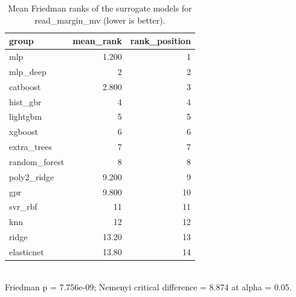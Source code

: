 \begin{table}[!t]
\centering
\caption{Mean Friedman ranks of the surrogate models for read_margin_mv (lower is better).}
\label{tab:statistics_surrogate_ranks_surrogate_read_margin_mv}
\footnotesize
\begin{tabular}{lrr}
\toprule
group & mean\_rank & rank\_position \\
\midrule
mlp & 1.200 & 1 \\
mlp\_deep & 2 & 2 \\
catboost & 2.800 & 3 \\
hist\_gbr & 4 & 4 \\
lightgbm & 5 & 5 \\
xgboost & 6 & 6 \\
extra\_trees & 7 & 7 \\
random\_forest & 8 & 8 \\
poly2\_ridge & 9.200 & 9 \\
gpr & 9.800 & 10 \\
svr\_rbf & 11 & 11 \\
knn & 12 & 12 \\
ridge & 13.20 & 13 \\
elasticnet & 13.80 & 14 \\
\bottomrule
\end{tabular}
\\[2pt] \footnotesize Friedman p = 7.756e-09; Nemenyi critical difference = 8.874 at alpha = 0.05.
\end{table}

